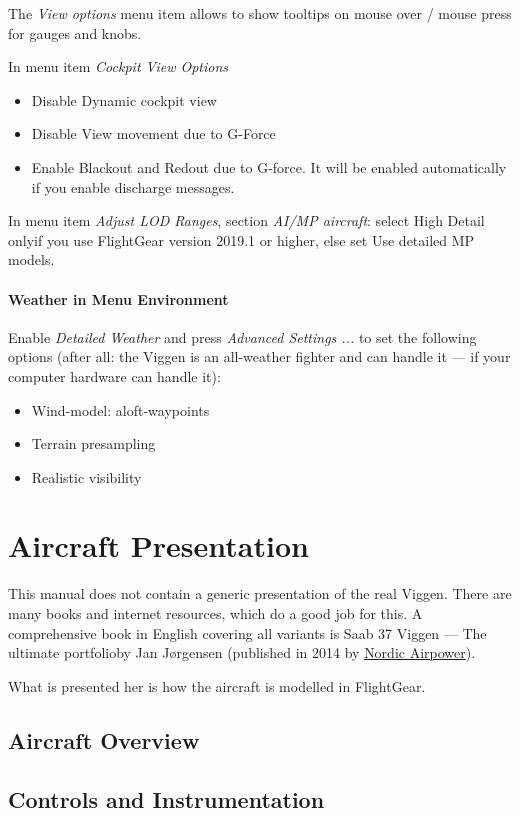 The \emph{View options} menu item allows to show tooltips on mouse over / mouse press for gauges and knobs.

In menu item \emph{Cockpit View Options}
\begin{itemize}
\item Disable \glqq Dynamic cockpit view \grqq
\item Disable \glqq View movement due to G-Force\grqq
\item Enable \glqq Blackout and Redout due to G-force\grqq. It will be enabled automatically if you enable discharge messages.
\end{itemize}

In menu item \emph{Adjust LOD Ranges}, section \emph{AI/MP aircraft}: select \glqq High Detail only\grqq if you use FlightGear version 2019.1 or higher, else set \glqq Use detailed MP models\grqq.

\subsection{Weather in Menu Environment}
Enable \emph{Detailed Weather} and press \emph{Advanced Settings ...} to set the following options (after all: the Viggen is an all-weather fighter and can handle it --- if your computer hardware can handle it):
\begin{itemize}
\item Wind-model: aloft-waypoints
\item Terrain presampling
\item Realistic visibility
\end{itemize}

\part{Aircraft Presentation}
This manual does not contain a generic presentation of the real Viggen. There are many books and internet resources, which do a good job for this. A comprehensive book in English covering all variants is \glqq Saab 37 Viggen --- The ultimate portfolio\grqq by Jan Jørgensen (published in 2014 by \href{http://www.nordicairpower.com/}{Nordic Airpower}).

What is presented her is how the aircraft is modelled in FlightGear.

\chapter{Aircraft Overview}
\chapter{Controls and Instrumentation}
